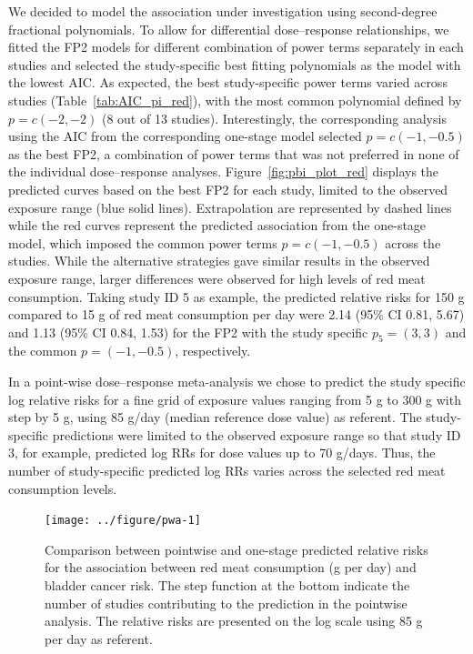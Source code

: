 \documentclass[11pt,a4paper,twoside,openany]{book}\usepackage{knitr}
\begin{document}
{\noindent We decided to model the association under investigation using second-degree fractional polynomials. To allow for differential dose--response relationships, we fitted the FP2 models for different combination of power terms separately in each studies and selected the study-specific best fitting polynomials as the model with the lowest AIC. As expected, the best study-specific power terms varied across studies (Table~\ref{tab:AIC_pi_red}), with the most common polynomial defined by $p = c(-2, -2)$ (8 out of 13 studies). Interestingly, the corresponding analysis using the AIC from the corresponding one-stage model selected $p = c(-1, -0.5)$ as the best FP2, a combination of power terms that was not preferred in none of the individual dose--response analyses. Figure~\ref{fig:pbi_plot_red} displays the predicted curves based on the best FP2 for each study, limited to the observed exposure range (blue solid lines). Extrapolation are represented by dashed lines while the red curves represent the predicted association from the one-stage model, which imposed the common power terms $p = c(-1, -0.5)$ across the studies. While the alternative strategies gave similar results in the observed exposure range, larger differences were observed for high levels of red meat consumption. Taking study ID 5 as example, the predicted relative risks for 150 g compared to 15 g of red meat consumption per day were 2.14 (95\% CI 0.81, 5.67) and 1.13 (95\% CI 0.84, 1.53) for the FP2 with the study specific $p_5 = (3, 3)$ and the common $p = (-1, -0.5)$, respectively. 

\noindent In a point-wise dose--response meta-analysis we chose to predict the study specific log relative risks for a fine grid of exposure values ranging from 5 g to 300 g with step by 5 g, using 85 g/day (median reference dose value) as referent. The study-specific predictions were limited to the observed exposure range so that study ID 3, for example, predicted log RRs for dose values up to 70 g/days. Thus, the number of study-specific predicted log RRs varies across the selected red meat consumption levels. 

\begin{knitrout}\footnotesize
{}\color{fgcolor}\begin{figure}[h]

{\centering \texttt{[image: ../figure/pwa-1]} 

}

\caption[Comparison between pointwise and one-stage predicted relative risks for the association between red meat consumption (g per day) and bladder cancer risk]{Comparison between pointwise and one-stage predicted relative risks for the association between red meat consumption (g per day) and bladder cancer risk. The step function at the bottom indicate the number of studies contributing to the prediction in the pointwise analysis. The relative risks are presented on the log scale using 85 g per day as referent.}\label{fig:pwa}
\end{figure}



\end{knitrout}}
\end{document}
